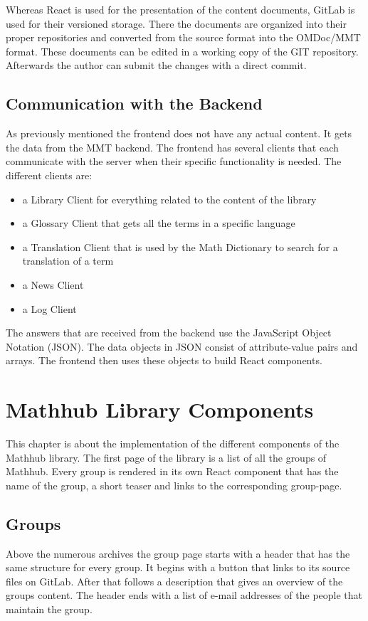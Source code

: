 \documentclass[11pt,a4paper]{article}
\begin{document}
Whereas React is used for the presentation of the content documents, GitLab is used for their versioned storage.
There the documents are organized into their proper repositories and converted from the source format into the OMDoc/MMT format.
These documents can be edited in a working copy of the GIT repository.
Afterwards the author can submit the changes with a direct commit.

\subsection{Communication with the Backend}

As previously mentioned the frontend does not have any actual content.
It gets the data from the MMT backend.
The frontend has several clients that each communicate with the server when their specific functionality is needed.
The different clients are:
\begin{itemize}
\item a Library Client for everything related to the content of the library
\item a Glossary Client that gets all the terms in a specific language
\item a Translation Client that is used by the Math Dictionary to search for a translation of a term 
\item a News Client
\item a Log Client
\end{itemize}

The answers that are received from the backend use the JavaScript Object Notation (JSON).
The data objects in JSON consist of attribute-value pairs and arrays.
The frontend then uses these objects to build React components.


\section{Mathhub Library Components}
This chapter is about the implementation of the different components of the Mathhub library.
The first page of the library is a list of all the groups of Mathhub.
Every group is rendered in its own React component that has the name of the group, a short teaser and links to the corresponding group-page.

\subsection{Groups}
Above the numerous archives the group page starts with a header that has the same structure for every group.
It begins with a button that links to its source files on GitLab.
After that follows a description that gives an overview of the groups content.
The header ends with a list of e-mail addresses of the people that maintain the group.
\end{document}
